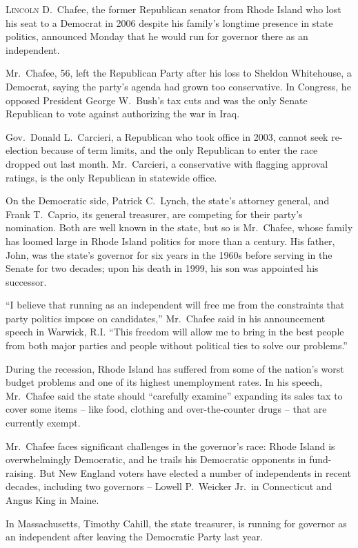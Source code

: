 ﻿\documentclass[12pt]{article}
\begin{document}
\lettrine{L}{incoln} D.~Chafee, the former Republican senator from Rhode
Island who lost his seat to a Democrat in 2006 despite his family's longtime presence in state
politics, announced Monday that he would run for governor there as an independent.

Mr.~Chafee, 56, left the Republican Party after his loss to Sheldon Whitehouse, a Democrat, saying
the party's agenda had grown too conservative. In Congress, he opposed President George W.~Bush's
tax cuts and was the only Senate Republican to vote against authorizing the war in Iraq.

Gov.~Donald L.~Carcieri, a Republican who took office in 2003, cannot seek re-election because of
term limits, and the only Republican to enter the race dropped out last month. Mr.~Carcieri, a
conservative with flagging approval ratings, is the only Republican in statewide office.

On the Democratic side, Patrick C.~Lynch, the state's attorney general, and Frank T.~Caprio, its
general treasurer, are competing for their party's nomination. Both are well known in the state, but
so is Mr.~Chafee, whose family has loomed large in Rhode Island politics for more than a century.
His father, John, was the state's governor for six years in the 1960s before serving in the Senate
for two decades; upon his death in 1999, his son was appointed his successor.

``I believe that running as an independent will free me from the constraints that party politics
impose on candidates,'' Mr.~Chafee said in his announcement speech in Warwick, R.I. ``This freedom
will allow me to bring in the best people from both major parties and people without political ties
to solve our problems.''

During the recession, Rhode Island has suffered from some of the nation's worst budget problems and
one of its highest unemployment rates. In his speech, Mr.~Chafee said the state should ``carefully
examine'' expanding its sales tax to cover some items -- like food, clothing and over-the-counter
drugs -- that are currently exempt.

Mr.~Chafee faces significant challenges in the governor's race: Rhode Island is overwhelmingly
Democratic, and he trails his Democratic opponents in fund-raising. But New England voters have
elected a number of independents in recent decades, including two governors -- Lowell P.~Weicker
Jr.~in Connecticut and Angus King in Maine.

In Massachusetts, Timothy Cahill, the state treasurer, is running for governor as an independent
after leaving the Democratic Party last year.
\end{document}
